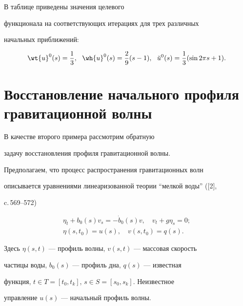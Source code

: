 \medskip





В таблице приведены значения целевого


функционала на соответствующих итерациях для трех различных


начальных приближений:


$$


\wt{u}^0 (s) = \frac{1}{3}, \ \ \wh{u}^0 (s) = \frac{2}{9}


(s-1), \ \ \breve{u}^0 (s) = \frac{1}{3} (\sin 2 \pi s + 1).


$$





\section{Восстановление начального профиля гравитационной волны}








В качестве второго примера рассмотрим обратную


задачу восстановления профиля гравитационной волны.





Предполагаем, что процесс распространения гравитационных волн


описывается уравнениями линеаризованной теории ``мелкой воды'' ([2],


c.\,569--572)


\begin{gather*}


\eta_t + b_0(s) v_s = - \dot b_0(s) v, \quad


v_t + g \eta_s = 0;\\


\eta(s,t_0) = u(s), \quad v(s,t_0) = q(s).


\end{gather*}


Здесь $\eta(s,t)$ --- профиль волны, $v(s,t)$ --- массовая скорость


частицы воды, $b_0(s)$ --- профиль дна, $q(s)$ --- известная


функция, $t \in T=[t_0,t_k]$, $s \in S=[s_0,s_k]$. Неизвестное


управление $u(s)$ --- начальный профиль волны.





